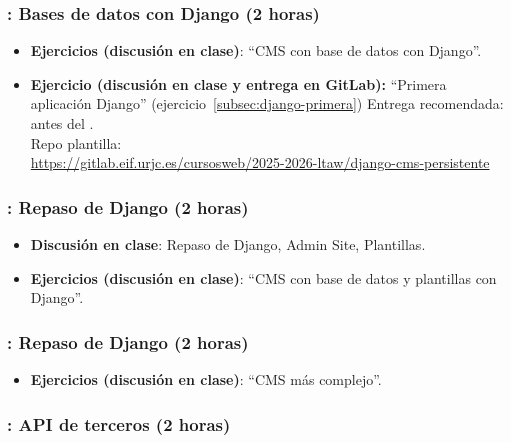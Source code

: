 \documentclass[a4paper,12pt]{article}
\begin{document}
\subsubsection{\martesJ: Bases de datos con Django (2 horas)}
\label{cal:martesJ}

\begin{itemize}
  \item \textbf{Ejercicios (discusión en clase)}: ``CMS con base de datos con Django''.
  \item \textbf{Ejercicio (discusión en clase y entrega en GitLab):} ``Primera aplicación Django'' (ejercicio~\ref{subsec:django-primera})
  Entrega recomendada: antes del \martesK. \\
  Repo plantilla: \\ {\footnotesize \url{https://gitlab.eif.urjc.es/cursosweb/2025-2026-ltaw/django-cms-persistente}}
\end{itemize}

\subsubsection{\lunesK: Repaso de Django (2 horas)}
\label{cal:lunesK}

\begin{itemize}
\item \textbf{Discusión en clase}: Repaso de Django, Admin Site, Plantillas.
\item \textbf{Ejercicios (discusión en clase)}: ``CMS con base de datos y plantillas con Django''.
\end{itemize}

\subsubsection{\martesK: Repaso de Django (2 horas)}
\label{cal:martesK}

\begin{itemize}
\item \textbf{Ejercicios (discusión en clase)}: ``CMS más complejo''.
\end{itemize}

\subsubsection{\lunesL: API de terceros (2 horas)}
\label{cal:lunesL}
\end{document}
